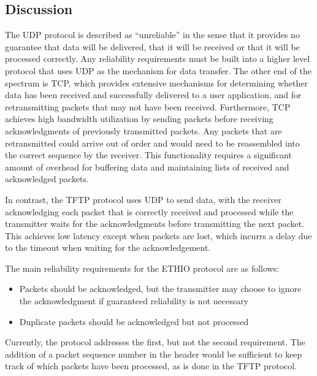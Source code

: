 \documentclass[11pt]{article}
\begin{document}
\subsection{Discussion}
The UDP protocol is described as ``unreliable'' in the sense that it
provides no guarantee that data will be delivered, that it will be received
or that it will be processed correctly.  Any reliability requirements must
be built into a higher level protocol that uses UDP as the mechanism for
data transfer.  The other end of the spectrum is TCP, which provides
extensive mechanisms for determining whether data has been received and
successfully delivered to a user application, and for retransmitting packets
that may not have been received.  Furthermore, TCP achieves high bandwidth
utilization by sending packets before receiving acknowledgments of previously
transmitted packets.  Any packets that are retransmitted could arrive out of
order and would need to be reassembled into the correct sequence by the
receiver.  This functionality requires a significant amount of overhead for
buffering data and maintaining lists of received and acknowledged packets.

In contrast, the TFTP protocol uses UDP to send data, with the receiver
acknowledging each packet that is correctly received and processed while the
transmitter waits for the acknowledgments before transmitting the next packet.
This achieves low latency except when packets are lost, which incurrs a delay
due to the timeout when waiting for the acknowledgement.

The main reliability requirements for the ETHIO protocol are as follows:
\begin{itemize}
  \item Packets should be acknowledged, but the transmitter may choose to
        ignore the acknowledgment if guaranteed reliability is not necessary
  \item Duplicate packets should be acknowledged but not processed
\end{itemize}
Currently, the protocol addresses the first, but not the second requirement.
The addition of a packet sequence number in the header would be sufficient
to keep track of which packets have been processed, as is done in the TFTP
protocol.
\end{document}

